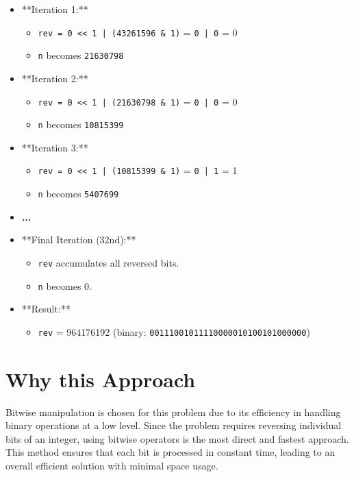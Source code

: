 \begin{itemize}
    \item **Iteration 1:**
    \begin{itemize}
        \item \texttt{rev = 0 << 1 | (43261596 \& 1)} = \texttt{0 | 0} = 0
        \item \texttt{n} becomes \texttt{21630798}
    \end{itemize}
    
    \item **Iteration 2:**
    \begin{itemize}
        \item \texttt{rev = 0 << 1 | (21630798 \& 1)} = \texttt{0 | 0} = 0
        \item \texttt{n} becomes \texttt{10815399}
    \end{itemize}
    
    \item **Iteration 3:**
    \begin{itemize}
        \item \texttt{rev = 0 << 1 | (10815399 \& 1)} = \texttt{0 | 1} = 1
        \item \texttt{n} becomes \texttt{5407699}
    \end{itemize}
    
    \item \textbf{...}
    
    \item **Final Iteration (32nd):**
    \begin{itemize}
        \item \texttt{rev} accumulates all reversed bits.
        \item \texttt{n} becomes 0.
    \end{itemize}
    
    \item **Result:**
    \begin{itemize}
        \item \texttt{rev} = 964176192 (binary: \texttt{00111001011110000010100101000000})
    \end{itemize}
\end{itemize}

\section*{Why this Approach}

Bitwise manipulation is chosen for this problem due to its efficiency in handling binary operations at a low level. Since the problem requires reversing individual bits of an integer, using bitwise operators is the most direct and fastest approach. This method ensures that each bit is processed in constant time, leading to an overall efficient solution with minimal space usage.

